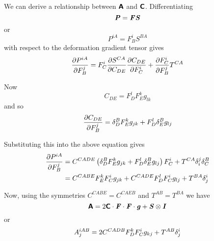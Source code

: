 We can derive a relationship between $\boldsymbol{\mathsf{A}}$ and $\boldsymbol{\mathsf{C}}$. Differentiating
\begin{equation}
  \boldsymbol{\mathit{P}}=\boldsymbol{\mathit{F}}\boldsymbol{\mathit{S}}
\end{equation}
or
\begin{equation}
  P^{iA}=F^{i}_{B}S^{BA}
\end{equation}
with respect to the deformation gradient tensor gives
\begin{equation}
   \dfrac{\partial P^{iA}}{\partial F^{j}_{B}} =F^{i}_{C} \dfrac{\partial S^{CA}}{\partial C_{DE}}  \dfrac{\partial C_{DE}}{\partial F^{i}_{C}} + \dfrac{\partial F^{i}_{C}}{\partial F^{j}_{B}} T^{CA}
\end{equation}

Now
\begin{equation}
  C_{DE}=F^{l}_{D}F^{k}_{E}g_{lk}
\end{equation}
and so
\begin{equation}
   \dfrac{\partial C_{DE}}{\partial F^{j}_{B}} = \delta_{D}^{B} F^{k}_{E}g_{jk}+F^{l}_{D} \delta_{E}^{B} g_{lj}
\end{equation}

Substituting this into the above equation gives
\begin{equation}
  \begin{split}
     \dfrac{\partial P^{iA}}{\partial F^{j}_{B}} &=C^{CADE}\left(  \delta_{D}^{B} F^{k}_{E}g_{jk}+
      F^{l}_{D} \delta_{E}^{B} g_{lj} \right)F^{i}_{C}+T^{CA} \delta_{i}^{j}  \delta_{C}^{B} \\
    &=C^{CABE}F^{k}_{E}F^{i}_{C}g_{jk}+C^{CADE}F^{l}_{D}F^{i}_{C}g_{lj}+T^{BA} \delta_{j}^{i} 
  \end{split}
\end{equation}

Now, using the symmetries $C^{CABE}=C^{CAEB}$ and $T^{AB}=T^{BA}$ we have
\begin{equation}
  \boldsymbol{\mathsf{A}}=2\boldsymbol{\mathsf{C}}\cdot\boldsymbol{\mathit{F}}\cdot\boldsymbol{\mathit{F}}\cdot\boldsymbol{\mathit{g}}+
   \boldsymbol{\mathit{S}} \otimes \boldsymbol{\mathit{I}} 
\end{equation}
or
\begin{equation}
  A^{iAB}_{j}=2C^{CADB}F^{k}_{D}F^{i}_{C}g_{kj}+T^{AB} \delta_{j}^{i} 
\end{equation}

